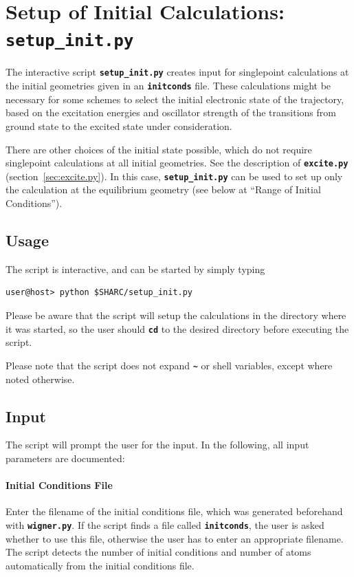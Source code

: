 \documentclass[a4paper,11pt,DIV=15,openany,twoside=false]{scrbook}
\newcommand{\ttt}[1]{\textbf{\texttt{#1}}}
\begin{document}
\section{Setup of Initial Calculations: \ttt{setup\_init.py}}\label{sec:setup_init.py}

The interactive script \ttt{setup\_init.py} creates input for singlepoint calculations at the initial geometries given in an \ttt{initconds} file. These calculations might be necessary for some schemes to select the initial electronic state of the trajectory, based on the excitation energies and oscillator strength of the transitions from ground state to the excited state under consideration. 

There are other choices of the initial state possible, which do not require singlepoint calculations at all initial geometries. See the description of \ttt{excite.py} (section~\ref{sec:excite.py}). In this case, \ttt{setup\_init.py} can be used to set up only the calculation at the equilibrium geometry (see below at ``Range of Initial Conditions'').

\subsection{Usage}

The script is interactive, and can be started by simply typing 
\begin{verbatim}
user@host> python $SHARC/setup_init.py
\end{verbatim}
Please be aware that the script will setup the calculations in the directory where it was started, so the user should \ttt{cd} to the desired directory before executing the script.

Please note that the script does not expand \ttt{\textasciitilde} or shell variables, except where noted otherwise.

\subsection{Input}

The script will prompt the user for the input. In the following, all input parameters are documented:

\paragraph{Initial Conditions File}

Enter the filename of the initial conditions file, which was generated beforehand with \ttt{wigner.py}. If the script finds a file called \ttt{initconds}, the user is asked whether to use this file, otherwise the user has to enter an appropriate filename. The script detects the number of initial conditions and number of atoms automatically from the initial conditions file.
\end{document}
